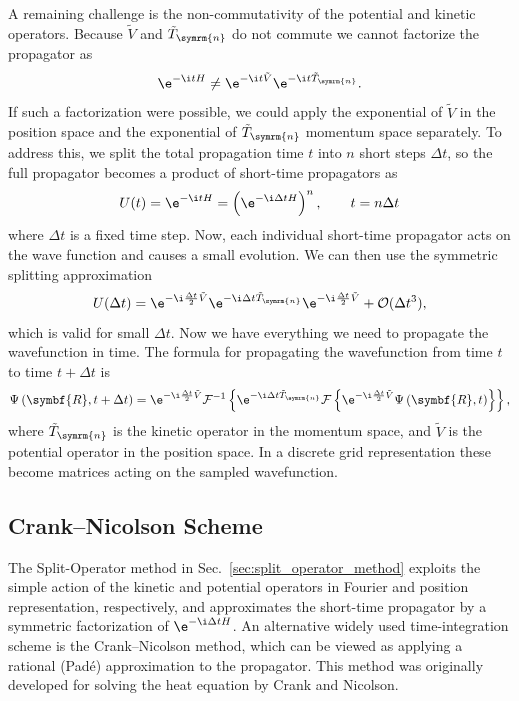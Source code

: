 A remaining challenge is the non-commutativity of the potential and kinetic operators. Because $\tilde{V}$ and $\tilde{T}_{\symrm{n}}$ do not commute we cannot factorize the propagator as
\begin{equation}
\e^{-\i tH}\neq\e^{-\i t\tilde{V}}\e^{-\i t\tilde{T}_{\symrm{n}}}.
\end{equation}
If such a factorization were possible, we could apply the exponential of $\tilde{V}$ in the position space and the exponential of $\tilde{T}_{\symrm{n}}$ momentum space separately. To address this, we split the total propagation time $t$ into $n$ short steps $\Delta t$, so the full propagator becomes a product of short-time propagators as
\begin{equation}
U(t)=\e^{-\i tH}=\left(\e^{-\i\Delta tH}\right)^n,\qquad t=n\Delta t
\end{equation}
where $\Delta t$ is a fixed time step. Now, each individual short-time propagator acts on the wave function and causes a small evolution. We can then use the symmetric splitting approximation
\begin{equation}
U(\Delta t)=\e^{-\i\frac{\Delta t}{2}\tilde{V}}\e^{-\i\Delta t\tilde{T}_{\symrm{n}}}\e^{-\i\frac{\Delta t}{2}\tilde{V}}+\mathcal{O}(\Delta t^3),
\end{equation}
which is valid for small $\Delta t$. Now we have everything we need to propagate the wavefunction in time. The formula for propagating the wavefunction from time $t$ to time $t+\Delta t$ is
\begin{equation}\label{eq:split_operator_propagation}
\Psi\left(\symbf{R},t+\Delta t\right)=\e^{-\i\frac{\Delta t}{2}\tilde V}\mathcal{F}^{-1}\left\lbrace\e^{-\i\Delta t\tilde{T}_{\symrm{n}}}\mathcal{F}\left\lbrace\e^{-\i\frac{\Delta t}{2}\tilde V}\Psi\left(\symbf{R},t\right)\right\rbrace\right\rbrace,
\end{equation}
where $\tilde{T}_{\symrm{n}}$ is the kinetic operator in the momentum space, and $\tilde{V}$ is the potential operator in the position space. In a discrete grid representation these become matrices acting on the sampled wavefunction.
\subsection{Crank--Nicolson Scheme}\label{sec:crank_nicolson_scheme}
The Split-Operator method in Sec.~\ref{sec:split_operator_method} exploits the simple action of the kinetic and potential operators in Fourier and position representation, respectively, and approximates the short-time propagator by a symmetric factorization of $\e^{-\i\Delta t H}$. An alternative widely used time-integration scheme is the Crank--Nicolson method, which can be viewed as applying a rational (Padé) approximation to the propagator. This method was originally developed for solving the heat equation by Crank and Nicolson.\supercite{10.1017/S0305004100023197}


